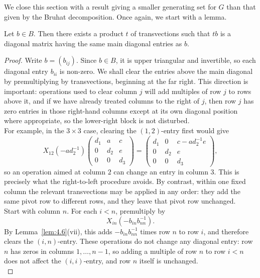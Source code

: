 \documentclass[../Odyssey_Project.tex]{subfiles}
\begin{document}
We close this section with a result giving a smaller generating set for $G$ than that given by the Bruhat decomposition. Once again, we start with a lemma.

\begin{lemma}
\label{lem:4.11}
Let $b \in B$. Then there exists a product $t$ of transvections such that $tb$ is a diagonal matrix having the same main diagonal entries as $b$.
\end{lemma}

\begin{proof}
Write $b=(b_{ij})$. Since $b\in B$, it is upper triangular and invertible, so each diagonal entry $b_{ii}$ is non-zero. We shall clear the entries above the main diagonal by premultiplying by transvections, beginning at the far right. This direction is important: operations used to clear column $j$ will add multiples of row $j$ to rows above it, and if we have already treated columns to the right of $j$, then row $j$ has zero entries in those right-hand columns except at its own diagonal position where appropriate, so the lower-right block is not disturbed.\\
For example, in the $3\times 3$ case, clearing the $(1,2)$-entry first would give
\[
    X_{12}(-ad_2^{-1})
    \begin{pmatrix}
        d_1 & a   & c\\
        0   & d_2 & e\\
        0   & 0   & d_3
    \end{pmatrix}
    =
    \begin{pmatrix}
        d_1 & 0   & c-ad_2^{-1}e\\
        0   & d_2 & e\\
        0   & 0   & d_3
    \end{pmatrix},
\]
so an operation aimed at column $2$ can change an entry in column $3$. This is precisely what the right-to-left procedure avoids. By contrast, within one fixed column the relevant transvections may be applied in any order: they add the same pivot row to different rows, and they leave that pivot row unchanged.\\
Start with column $n$. For each $i<n$, premultiply by
\[
    X_{in}(-b_{in}b_{nn}^{-1}).
\]
By Lemma~\ref{lem:4.6}(vii), this adds $-b_{in}b_{nn}^{-1}$ times row $n$ to row $i$, and therefore clears the $(i,n)$-entry. These operations do not change any diagonal entry: row $n$ has zeros in columns $1,\ldots,n-1$, so adding a multiple of row $n$ to row $i<n$ does not affect the $(i,i)$-entry, and row $n$ itself is unchanged.\\

\end{proof}
\end{document}
